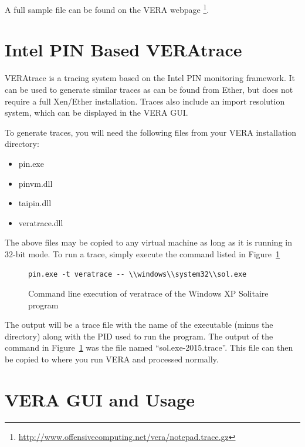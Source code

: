 \documentclass[11pt]{article}
\begin{document}
A full sample file can be found on the VERA webpage
\footnote{\url{http://www.offensivecomputing.net/vera/notepad.trace.gz}}.

\section{Intel PIN Based VERAtrace}\label{sec:pinvera}

VERAtrace is a tracing system based on the Intel PIN monitoring
framework. It can be used to generate similar traces as can be found
from Ether, but does not require a full Xen/Ether installation. Traces
also include an import resolution system, which can be displayed in
the VERA GUI.

To generate traces, you will need the following files from your VERA
installation directory:

\begin{itemize}
\item pin.exe
\item pinvm.dll
\item taipin.dll
\item veratrace.dll
\end{itemize}

The above files may be copied to any virtual machine as long as it is
running in 32-bit mode. To run a trace, simply execute the command
listed in Figure~\ref{fig:veratrace}

\begin{figure}[htb]
\centering
\begin{verbatim}
pin.exe -t veratrace -- \\windows\\system32\\sol.exe
\end{verbatim}
\caption{Command line execution of veratrace of the Windows XP
Solitaire program}\label{fig:veratrace}
\end{figure}

The output will be a trace file with the name of the executable (minus
the directory) along with the PID used to run the program. The output
of the command in Figure~\ref{fig:veratrace} was the file named
``sol.exe-2015.trace''. This file can then be copied to where you run
VERA and processed normally.

\section{VERA GUI and Usage}\label{sec:gui}
\end{document}
